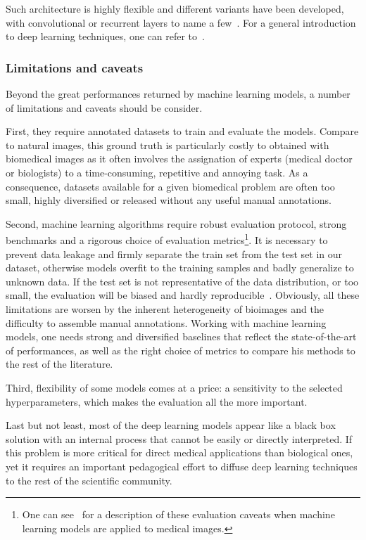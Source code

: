 Such architecture is highly flexible and different variants have been developed, with convolutional or recurrent layers to name a few~\cite{lecun_deep_2015}.
For a general introduction to deep learning techniques, one can refer to~\cite{Goodfellow_2016}.

\subsubsection{Limitations and caveats}

Beyond the great performances returned by machine learning models, a number of limitations and caveats should be consider.

First, they require annotated datasets to train and evaluate the models.
Compare to natural images, this ground truth is particularly costly to obtained with biomedical images as it often involves the assignation of experts (medical doctor or biologists) to a time-consuming, repetitive and annoying task.
As a consequence, datasets available for a given biomedical problem are often too small, highly diversified or released without any useful manual annotations.

Second, machine learning algorithms require robust evaluation protocol, strong benchmarks and a rigorous choice of evaluation metrics\footnote{One can see~\cite{varoquaux_machine_2022} for a description of these evaluation caveats when machine learning models are applied to medical images.}.
It is necessary to prevent data leakage and firmly separate the train set from the test set in our dataset, otherwise models overfit to the training samples and badly generalize to unknown data.
If the test set is not representative of the data distribution, or too small, the evaluation will be biased and hardly reproducible~\cite{Varoquaux_cv_2018}.
Obviously, all these limitations are worsen by the inherent heterogeneity of bioimages and the difficulty to assemble manual annotations.
Working with machine learning models, one needs strong and diversified baselines that reflect the state-of-the-art of performances, as well as the right choice of metrics to compare his methods to the rest of the literature.

Third, flexibility of some models comes at a price: a sensitivity to the selected hyperparameters, which makes the evaluation all the more important.

Last but not least, most of the deep learning models appear like a black box solution with an internal process that cannot be easily or directly interpreted.
If this problem is more critical for direct medical applications than biological ones, yet it requires an important pedagogical effort to diffuse deep learning techniques to the rest of the scientific community.

